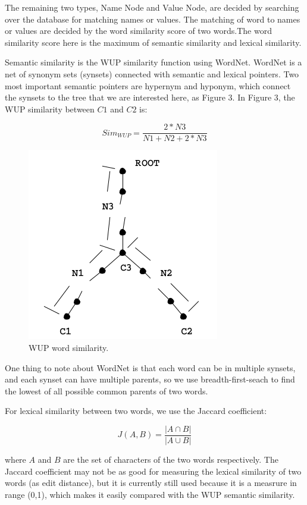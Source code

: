 \documentclass[twocolumn]{article}
\begin{document}
The remaining two types, Name Node and Value Node, are decided by searching over the database for matching names or values. The matching of word to names or values are decided by the word similarity score of two words.The word similarity score here is the maximum of semantic similarity and lexical similarity.

Semantic similarity is the WUP similarity function using WordNet. WordNet is a net of synonym sets (synsets) connected with semantic and lexical pointers. Two most important semantic pointers are hypernym and hyponym, which connect the synsets to the tree that we are interested here, as Figure 3. In Figure 3, the WUP similarity between $C1$ and $C2$ is:

$$ Sim_{WUP} = \frac{2*N3}{N1+N2+2*N3} $$

\begin{figure}[ht]
  \centering
  \includegraphics[width=0.7\linewidth]{figures/wordnet_tree.png}
  \caption[caption for wordnet tree]{WUP word similarity.\protect\footnotemark }
\end{figure}

One thing to note about WordNet is that each word can be in multiple synsets, and each synset can have multiple parents, so we use breadth-first-seach to find the lowest of all possible common parents of two words.

For lexical similarity between two words, we use the Jaccard coefficient:

$$ J(A, B) = \frac{|A \cap B|}{|A \cup B|}$$

where $A$ and $B$ are the set of characters of the two words respectively. The Jaccard coefficient may not be as good for measuring the lexical similarity of two words (as edit distance), but it is currently still used because it is a measrure in range (0,1), which makes it easily compared with the WUP semantic similarity.
\end{document}
